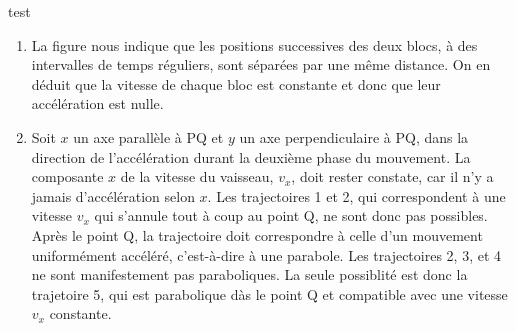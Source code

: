 %
%

test
\\[-3mm]
\begin{enumerate}
\item La figure nous indique que les positions successives des deux blocs, à des intervalles de temps réguliers, sont séparées par une même distance. On en déduit que la vitesse de chaque bloc est constante et donc que leur accélération est nulle.

\item Soit $x$ un axe parallèle à PQ et $y$ un axe perpendiculaire à PQ, dans la direction de l'accélération durant la deuxième phase du mouvement. La composante $x$ de la vitesse du vaisseau, $v_x$, doit rester constate, car il n'y a jamais d'accélération selon $x$. Les trajectoires 1 et 2, qui correspondent à une vitesse $v_x$ qui s'annule tout à coup au point Q, ne sont donc pas possibles. Après le point Q, la trajectoire doit correspondre à celle d'un mouvement uniformément accéléré, c'est-à-dire à une parabole. Les trajectoires 2, 3, et 4 ne sont manifestement pas paraboliques. La seule possiblité est donc la trajetoire 5, qui est parabolique dàs le point Q et compatible avec une vitesse $v_x$ constante.

\end{enumerate}

